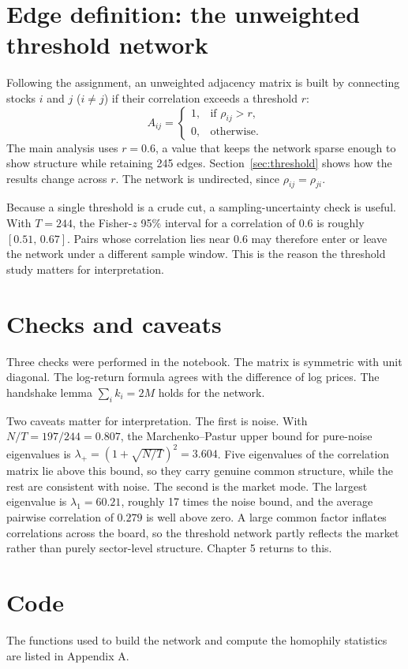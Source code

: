 \documentclass[12pt,a4paper]{report}
\begin{document}
\section{Edge definition: the unweighted threshold network}
Following the assignment, an unweighted adjacency matrix is built by connecting stocks $i$ and $j$ ($i\neq j$) if their correlation exceeds a threshold $r$:
\begin{equation}
  A_{ij} =
  \begin{cases}
    1, & \text{if } \rho_{ij} > r,\\
    0, & \text{otherwise.}
  \end{cases}
\end{equation}
The main analysis uses $r=0.6$, a value that keeps the network sparse enough to show structure while retaining 245 edges. Section~\ref{sec:threshold} shows how the results change across $r$. The network is undirected, since $\rho_{ij}=\rho_{ji}$.

Because a single threshold is a crude cut, a sampling-uncertainty check is useful. With $T=244$, the Fisher-$z$ 95\% interval for a correlation of $0.6$ is roughly $[0.51,\,0.67]$. Pairs whose correlation lies near $0.6$ may therefore enter or leave the network under a different sample window. This is the reason the threshold study matters for interpretation.

\section{Checks and caveats}
Three checks were performed in the notebook. The matrix is symmetric with unit diagonal. The log-return formula agrees with the difference of log prices. The handshake lemma $\sum_i k_i = 2M$ holds for the network.

Two caveats matter for interpretation. The first is noise. With $N/T = 197/244 = 0.807$, the Marchenko--Pastur upper bound for pure-noise eigenvalues is $\lambda_+=(1+\sqrt{N/T})^2 = 3.604$. Five eigenvalues of the correlation matrix lie above this bound, so they carry genuine common structure, while the rest are consistent with noise. The second is the market mode. The largest eigenvalue is $\lambda_1 = 60.21$, roughly 17 times the noise bound, and the average pairwise correlation of $0.279$ is well above zero. A large common factor inflates correlations across the board, so the threshold network partly reflects the market rather than purely sector-level structure. Chapter 5 returns to this.

\section{Code}
The functions used to build the network and compute the homophily statistics are listed in Appendix A.
\end{document}
